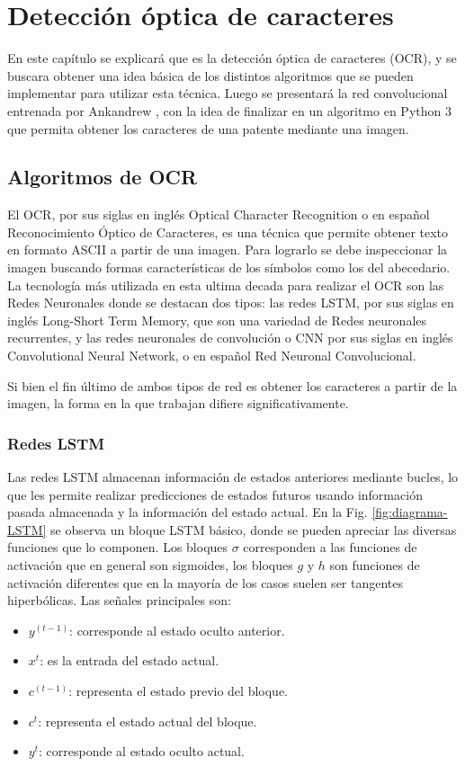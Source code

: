 \chapter{Detección óptica de caracteres}

En este capítulo se explicará que es la detección óptica de caracteres (OCR), y se buscara obtener una idea básica
de los distintos algoritmos que se pueden implementar para
utilizar esta técnica.
Luego se presentará la red convolucional entrenada por
Ankandrew \cite{ankandrew_reconocedor_2023}, con la idea de finalizar en un algoritmo en Python 3
que permita obtener los caracteres de una patente mediante una imagen.

\section{Algoritmos de OCR}

El OCR, por sus siglas en inglés Optical Character
Recognition o en español Reconocimiento Óptico de Caracteres, es una técnica que permite
obtener texto en formato ASCII a partir de una imagen.
Para lograrlo se debe inspeccionar la imagen buscando formas características de los símbolos como los del abecedario.
La tecnología más utilizada en esta ultima decada para realizar el OCR son las Redes Neuronales donde se destacan dos tipos: las redes LSTM, por sus siglas en inglés Long-Short Term Memory, que son una variedad de Redes
neuronales recurrentes, y las redes neuronales de convolución o CNN por sus siglas en inglés Convolutional Neural Network, o en español Red Neuronal Convolucional.

Si bien el fin último de ambos tipos de red es obtener los caracteres a partir de la imagen, la forma en
la que trabajan difiere significativamente.

\subsection{Redes LSTM}

Las redes LSTM almacenan información de estados anteriores mediante bucles,
lo que les permite realizar predicciones de estados futuros usando información pasada almacenada y la información
del estado actual.
En la Fig. \ref{fig:diagrama-LSTM} se observa un bloque LSTM básico, donde se pueden apreciar las diversas funciones que lo componen. Los bloques $\sigma$ corresponden a las funciones de activación que en general son sigmoides, los bloques $g$ y $h$ son funciones de activación diferentes que en la mayoría de los casos suelen ser tangentes hiperbólicas.
Las señales principales son:
\begin{itemize}
    \item $y^{(t-1)}$: corresponde al estado oculto anterior.
    \item $x^t$: es la entrada del estado actual.
    \item $c^{(t-1)}$: representa el estado previo del bloque.
    \item $c^t$: representa el estado actual del bloque.
    \item $y^t$: corresponde al estado oculto actual.
\end{itemize}

